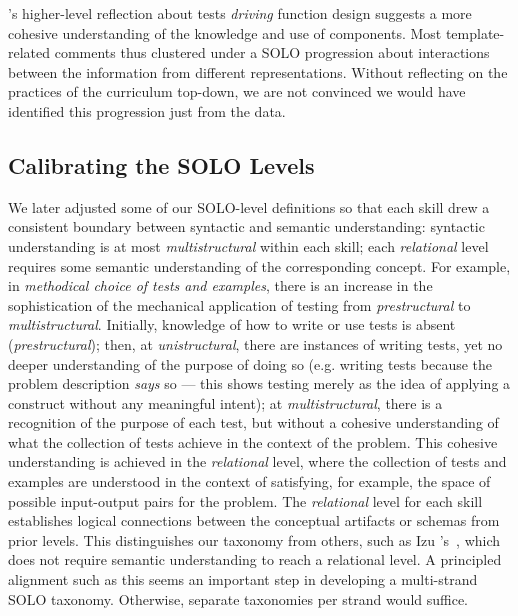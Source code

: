 
\noindent
\stwelve's higher-level reflection about tests \emph{driving} function
design suggests a more cohesive understanding of the knowledge and use
of \htdp components. Most template-related comments thus clustered
under a SOLO progression about interactions between the information
from different representations.  Without reflecting on the practices
of the curriculum top-down, we are not convinced we would have
identified this progression just from the data.

\subsection{Calibrating the SOLO Levels}
\label{s:align}

We later adjusted some of our SOLO-level definitions so that each skill drew a
consistent boundary between syntactic and semantic understanding:
syntactic understanding is at most \emph{multistructural} within each skill;
each \emph{relational} level requires some semantic understanding of the
corresponding concept.  For example, in \emph{methodical
choice of tests and examples}, there is an increase in the sophistication of
the mechanical application of testing from \emph{prestructural} to
\emph{multistructural}. Initially, knowledge of how to write or use tests is
absent (\emph{prestructural}); then, at \emph{unistructural}, there are instances of writing tests, yet no deeper understanding of
the purpose of doing so (e.g. writing tests because the problem description \emph{says}
so --- this shows testing merely as the idea of applying a construct without any meaningful intent); at \emph{multistructural}, there is a recognition of the purpose of
each test, but without a cohesive understanding of what the collection of tests
achieve in the context of the problem. This cohesive understanding is achieved
in the \emph{relational} level, where the collection of tests and examples
are understood in the context of satisfying, for example, the space of possible
input-output pairs for the problem. The \emph{relational} level for each skill
establishes logical connections between the conceptual artifacts or schemas
from prior levels. This distinguishes our taxonomy from others, such as Izu
\etal's~\cite{izu-code-design-solo16}, which does not require semantic
understanding to reach a relational level.  A principled alignment
such as this seems an important step in developing a multi-strand SOLO
taxonomy.  Otherwise, separate taxonomies per strand would suffice.

